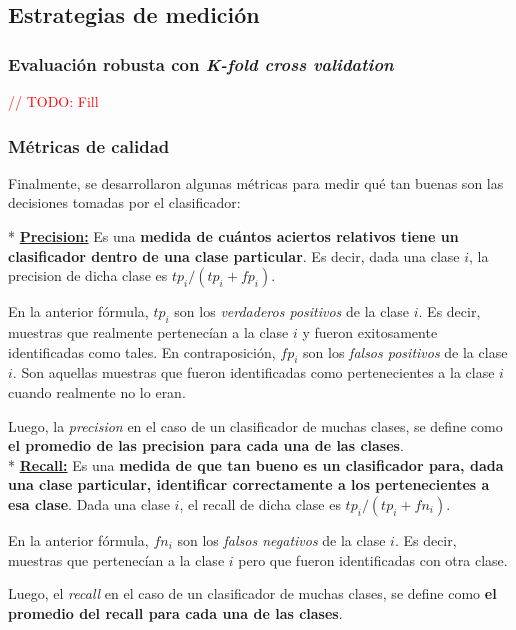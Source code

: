 \subsection{Estrategias de medici\'on}

\subsubsection{Evaluaci\'on robusta con \textit{K-fold cross validation}}

\textcolor{red}{// TODO: Fill}

\subsubsection{M\'etricas de calidad}

Finalmente, se desarrollaron algunas m\'etricas para medir qu\'e tan buenas son las decisiones tomadas por el clasificador:

* \underline{\textbf{Precision:}} Es una \textbf{medida de cu\'antos aciertos relativos tiene un clasificador dentro de una clase particular}. Es decir, dada una clase $i$, la precision de dicha clase es $tp_{i} / (tp_{i} + fp_{i})$.

En la anterior f\'ormula, $tp_{i}$ son los \textit{verdaderos positivos} de la clase $i$. Es decir, muestras que realmente pertenec\'ian a la clase $i$ y fueron exitosamente identificadas como tales. En contraposici\'on, $fp_{i}$ son los \textit{falsos positivos} de la clase $i$. Son aquellas muestras que fueron identificadas como pertenecientes a la clase $i$ cuando realmente no lo eran.

Luego, la \textit{precision} en el caso de un clasificador de muchas clases, se define como \textbf{el promedio de las precision para cada una de las clases}. \\

* \underline{\textbf{Recall:}} Es una \textbf{medida de que tan bueno es un clasificador para, dada una clase particular, identificar correctamente a los pertenecientes a esa clase}. Dada una clase $i$, el recall de dicha clase es $tp_{i} / (tp_{i} + fn_{i})$.

En la anterior f\'ormula, $fn_{i}$ son los \textit{falsos negativos} de la clase $i$. Es decir, muestras que pertenec\'ian a la clase $i$ pero que fueron identificadas con otra clase.

Luego, el \textit{recall} en el caso de un clasificador de muchas clases, se define como \textbf{el promedio del recall para cada una de las clases}. \\

